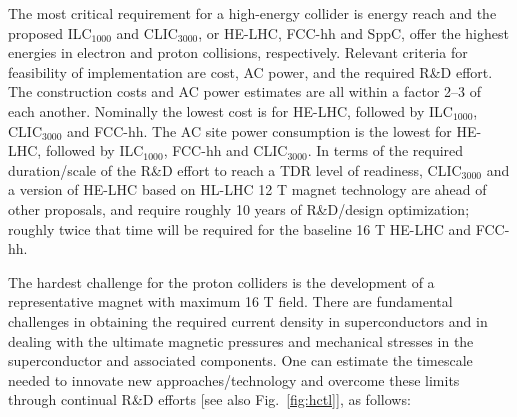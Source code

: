 The most critical requirement for a high-energy collider is energy reach and the proposed ILC$_{1000}$ and CLIC$_{3000}$, or HE-LHC, FCC-hh and SppC, offer the highest energies in electron and proton collisions, respectively. Relevant criteria for feasibility of implementation are cost, AC power, and the required R\&D effort. The construction costs and AC power estimates are all within a factor 2--3 of each another. Nominally the lowest cost is for HE-LHC, followed by ILC$_{1000}$, CLIC$_{3000}$ and FCC-hh. The AC site power consumption is the lowest for HE-LHC, followed by ILC$_{1000}$, FCC-hh and CLIC$_{3000}$.  In terms of the required duration/scale of the R\&D effort to reach a TDR level of readiness, CLIC$_{3000}$ and a version of HE-LHC based on HL-LHC 12 T magnet technology are ahead of other proposals, and require roughly 10 years of R\&D/design optimization;  roughly twice that time will be required for the baseline 16 T HE-LHC and FCC-hh.

The hardest challenge for the proton colliders is the development of a representative magnet with maximum 16 T field. There are fundamental challenges in obtaining the required current density in superconductors and in dealing with the ultimate magnetic pressures and mechanical stresses in the superconductor and associated components. One can estimate the timescale needed to innovate new approaches/technology and overcome these limits through continual R\&D efforts [see also Fig.~\ref{fig:hctl}], as follows:

